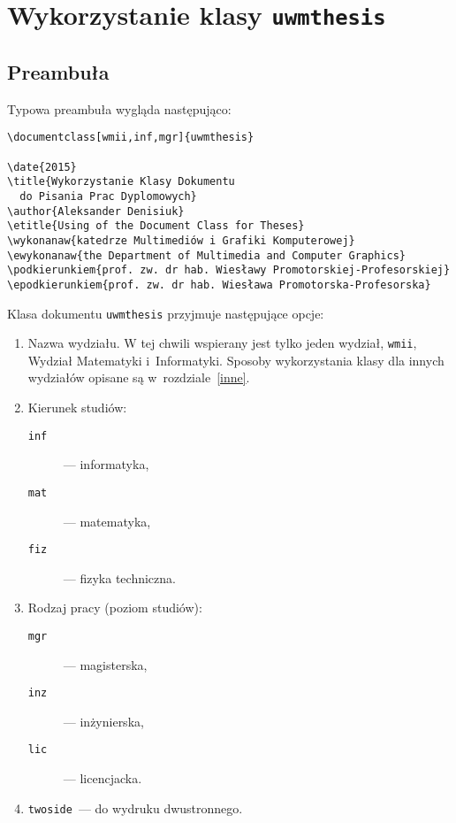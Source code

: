 \chapter{Wykorzystanie klasy \texttt{uwmthesis}}
\section{Preambuła}

Typowa preambuła wygląda następująco:
\begin{verbatim}
\documentclass[wmii,inf,mgr]{uwmthesis}

\date{2015}
\title{Wykorzystanie Klasy Dokumentu 
  do Pisania Prac Dyplomowych}
\author{Aleksander Denisiuk}
\etitle{Using of the Document Class for Theses}
\wykonanaw{katedrze Multimediów i Grafiki Komputerowej}
\ewykonanaw{the Department of Multimedia and Computer Graphics}
\podkierunkiem{prof. zw. dr hab. Wiesławy Promotorskiej-Profesorskiej}
\epodkierunkiem{prof. zw. dr hab. Wiesława Promotorska-Profesorska}
\end{verbatim}

Klasa dokumentu \texttt{uwmthesis} przyjmuje następujące opcje:
\begin{enumerate}
 \item Nazwa wydziału. W tej chwili wspierany jest tylko jeden wydział, \texttt{wmii}, Wydział Matematyki i~Informatyki. Sposoby wykorzystania klasy dla innych wydziałów opisane są w~rozdziale~\ref{inne}.
 \item Kierunek studiów:
 \begin{description}
  \item [\texttt{inf}]--- informatyka,
  \item [\texttt{mat}]--- matematyka,
  \item [\texttt{fiz}]--- fizyka techniczna.
 \end{description}
\item Rodzaj pracy (poziom studiów):
 \begin{description}
  \item [\texttt{mgr}]--- magisterska,
  \item [\texttt{inz}]--- inżynierska,
  \item [\texttt{lic}]--- licencjacka.
 \end{description}
\item \texttt{twoside}~--- do wydruku dwustronnego.
\end{enumerate}

